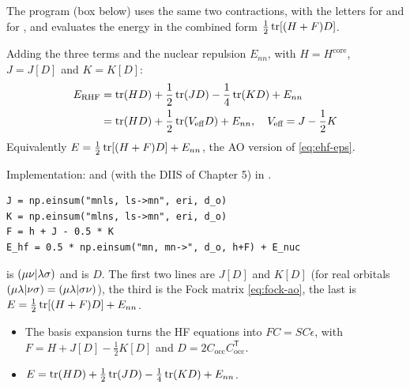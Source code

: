 The program  (box below) uses the same two contractions, with the letters  for  and  for , and evaluates the energy in the combined form \mbox{$\frac{1}{2} \operatorname{tr}[(H + F) D]$}.

Adding the three terms and the nuclear repulsion $E_{nn}$, with $H = H^{\text{core}}$, $J = J[D]$ and $K = K[D]$:
\begin{align}\label{eq:e-ao}
E_{\text{RHF}} &= \operatorname{tr}(H D) + \frac{1}{2} \operatorname{tr}(J D) - \frac{1}{4} \operatorname{tr}(K D) + E_{nn} \\
&= \operatorname{tr}(H D) + \frac{1}{2} \operatorname{tr}(V_{\text{eff}} D) + E_{nn}, \quad V_{\text{eff}} = J - \frac{1}{2} K
\end{align}
Equivalently $E = \frac{1}{2} \operatorname{tr}[(H + F) D] + E_{nn}$, the AO version of \eqref{eq:ehf-eps}.

Implementation:  and  (with the DIIS of Chapter 5) in .

\begin{codemap}
\begin{lstlisting}[frame=none, numbers=none, xleftmargin=0pt, backgroundcolor={}]
J = np.einsum("mnls, ls->mn", eri, d_o)
K = np.einsum("mlns, ls->mn", eri, d_o)
F = h + J - 0.5 * K
E_hf = 0.5 * np.einsum("mn, mn->", d_o, h+F) + E_nuc
\end{lstlisting}
 is $(\mu\nu\vert \lambda\sigma)$ and  is $D$. The first two lines are $J[D]$ and $K[D]$ (for real orbitals $(\mu\lambda\vert \nu\sigma) = (\mu\lambda\vert \sigma\nu)$), the third is the Fock matrix \eqref{eq:fock-ao}, the last is $E = \frac{1}{2} \operatorname{tr}[(H + F) D] + E_{nn}$.
\end{codemap}

\begin{summary}
\begin{itemize}
\item The basis expansion turns the HF equations into $F C = S C \epsilon$, with $F = H + J[D] - \frac{1}{2} K[D]$ and $D = 2 C_{\text{occ}} C_{\text{occ}}^{\mathsf T}$.
\item $E = \operatorname{tr}(HD) + \frac{1}{2} \operatorname{tr}(JD) - \frac{1}{4} \operatorname{tr}(KD) + E_{nn}$.
\end{itemize}
\end{summary}
